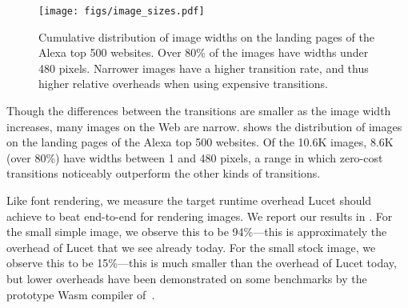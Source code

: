 
\begin{figure}
  \texttt{[image: figs/image\_sizes.pdf]}
  \caption{
    Cumulative distribution of image widths on the landing pages of the Alexa 
    top 500 websites.
    Over 80\% of the images have widths under 480 pixels.
    Narrower images have a higher transition rate, and thus higher relative
    overheads when using expensive transitions.
  }
  \label{fig:image-sizes}
\end{figure}


Though the differences between the transitions are smaller as the image width
increases, many images on the Web are narrow.
 shows the distribution of images on the landing
pages of the Alexa top 500 websites. Of the 10.6K images, 8.6K (over 80\%) have
widths between 1 and 480 pixels, a range in which zero-cost transitions
noticeably outperform the other kinds of transitions.

Like font rendering, we measure the target runtime overhead Lucet should
achieve to beat \tridealheavysixfour end-to-end for rendering images.
%
We report our results in .
%
For the small simple image, we observe this to be 94\%\dash---this is approximately the overhead of Lucet that we see already today.
%
For the small stock image, we observe this to be 15\%\dash---this is much smaller than the overhead of Lucet today, but lower overheads have been demonstrated on some benchmarks by the prototype Wasm compiler of~\citet{sledge}.

